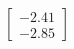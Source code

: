 \documentclass[preview]{standalone}
\begin{document}
\begin{align*}
\begin{bmatrix} -2.41 \\ -2.85 \end{bmatrix}
\end{align*}
\end{document}
